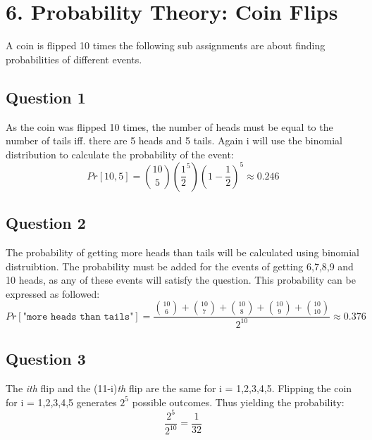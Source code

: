 \documentclass{article}
\begin{document}
\section{6. Probability Theory: Coin Flips}
A coin is flipped 10 times the following sub assignments are about finding probabilities of different events.
\subsection{Question 1}
As the coin was flipped 10 times, the number of heads must be equal to the number of tails iff. there are 5 heads and 5 tails. Again i will use the binomial distribution to calculate the probability of the event:
$$
Pr[10,5] = \binom{10}{5} \left(\dfrac{1}{2}^5\right)\left(1-\dfrac{1}{2}\right)^5
\approx 0.246
$$
\subsection{Question 2}
The probability of getting more heads than tails will be calculated using binomial distruibtion. The probability must be added for the events of getting 6,7,8,9 and 10 heads, as any of these events will satisfy the question. This probability can be expressed as followed:
$$
Pr[\texttt{"more heads than tails"}] = \dfrac{\binom{10}{6} + \binom{10}{7} + \binom{10}{8} + \binom{10}{9} + \binom{10}{10}}{2^{10}} \approx 0.376
$$
\subsection{Question 3}
The \textit{ith} flip and the (11-i)\textit{th} flip are the same for i = 1,2,3,4,5. Flipping the coin for i = 1,2,3,4,5 generates $2^5$ possible outcomes. Thus yielding the probability:
$$
\dfrac{2^5}{2^{10}} = \dfrac{1}{32}
$$
\end{document}

